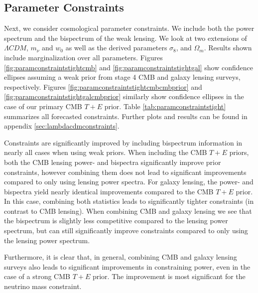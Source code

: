 \documentclass[11pt]{article} %
\begin{document}
\subsection{Parameter Constraints}
Next, we consider cosmological parameter constraints. We include both the power spectrum and the bispectrum of the weak lensing. We look at two extensions of $\Lambda CDM$, $m_\nu$ and $w_0$ as well as the derived parameters $\sigma_8$, and $\Omega_m$. Results shown include marginalization over all parameters. Figures \ref{fig:paramconstraintstightcmb} and \ref{fig:paramconstraintstightgal} show confidence ellipses assuming a weak prior from stage 4 CMB and galaxy lensing surveys, respectively. Figures \ref{fig:paramconstraintstightcmbcmbprior} and \ref{fig:paramconstraintstightgalcmbprior} similarly show confidence ellipses in the case of our primary CMB $T+E$ prior. Table \ref{tab:paramconstraintstight} summarizes all forecasted constraints. Further plots and results can be found in appendix \ref{sec:lambdacdmconstraints}.

Constraints are significantly improved by including bispectrum information in nearly all cases when using weak priors. When including the CMB $T+E$ priors, both the CMB lensing power- and bispectra significantly improve prior constraints, however combining them does not lead to significant improvements compared to only using lensing power spectra. For galaxy lensing, the power- and bispectra yield nearly identical improvements compared to the CMB $T+E$ prior. In this case, combining both statistics leads to significantly tighter constraints (in contrast to CMB lensing). When combining CMB and galaxy lensing we see that the bispectrum is slightly less competitive compared to the lensing power spectrum, but can still significantly improve constraints compared to only using the lensing power spectrum.

Furthermore, it is clear that, in general, combining CMB and galaxy lensing surveys also leads to significant improvements in constraining power, even in the case of a strong CMB $T+E$ prior. The improvement is most significant for the neutrino mass constraint.
\end{document}
